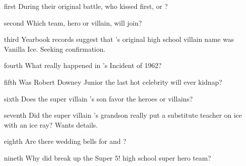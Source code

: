\documentclass[notebook]{LRSguildcamp1} %
\begin{document}
\startnotebook{\nTest{}}

\begin{page}{first}
During their original battle, who kissed first, \OS{\MYsupername} or \Oldest{\MYsupername}?
\end{page}

\begin{page}{second}
Which team, hero or villain, will \cGrad{} join?
\end{page}

\begin{page}{third}
Yearbook records suggest that \cOldest{\MYsupername}'s original high school villain name was Vanilla Ice. Seeking confirmation. 
\end{page}

\begin{page}{fourth}
What really happened in \cGrandma{\MYsupername}'s Incident of 1962?
\end{page}

\begin{page}{fifth}
Was Robert Downey Junior the last hot celebrity  \cGrandma{\MYsupername} will ever kidnap?
\end{page}


\begin{page}{sixth}
Does the super villain \cGrandma{\MYsupername}'s son \cArchitect{} favor the heroes or villains?
\end{page}


\begin{page}{seventh}
Did the super villain \cGrandma{\MYsupername}'s grandson \cTeen{} really put a substitute teacher on ice with an ice ray? Wants details. 
\end{page}

\begin{page}{eighth}
Are there wedding bells for \cYoungest{\MYsupername} and \cYS{\MYsupername} ?
\end{page}

\begin{page}{nineth}
Why did \cYoungest{\MYsupername} break up the Super 5! high school super hero team?
\end{page}

\endnotebook
\end{document}
